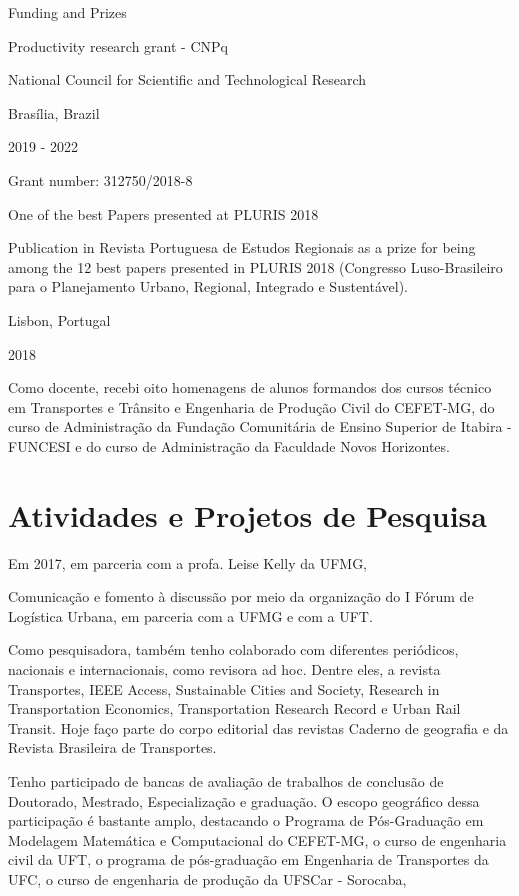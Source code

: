 \documentclass[
]{book}
\begin{document}
Funding and Prizes

Productivity research grant - CNPq

National Council for Scientific and Technological Research

Brasília, Brazil

2019 - 2022

Grant number: 312750/2018-8

One of the best Papers presented at PLURIS 2018

Publication in Revista Portuguesa de Estudos Regionais as a prize for
being among the 12 best papers presented in PLURIS 2018 (Congresso
Luso-Brasileiro para o Planejamento Urbano, Regional, Integrado e
Sustentável).

Lisbon, Portugal

2018

Como docente, recebi oito homenagens de alunos formandos dos cursos
técnico em Transportes e Trânsito e Engenharia de Produção Civil do
CEFET-MG, do curso de Administração da Fundação Comunitária de Ensino
Superior de Itabira - FUNCESI e do curso de Administração da Faculdade
Novos Horizontes.

\hypertarget{atividades-e-projetos-de-pesquisa}{%
\section{Atividades e Projetos de
Pesquisa}\label{atividades-e-projetos-de-pesquisa}}

Em 2017, em parceria com a profa. Leise Kelly da UFMG,

Comunicação e fomento à discussão por meio da organização do I Fórum de
Logística Urbana, em parceria com a UFMG e com a UFT.

Como pesquisadora, também tenho colaborado com diferentes periódicos,
nacionais e internacionais, como revisora ad hoc. Dentre eles, a revista
Transportes, IEEE Access, Sustainable Cities and Society, Research in
Transportation Economics, Transportation Research Record e Urban Rail
Transit. Hoje faço parte do corpo editorial das revistas Caderno de
geografia e da Revista Brasileira de Transportes.

Tenho participado de bancas de avaliação de trabalhos de conclusão de
Doutorado, Mestrado, Especialização e graduação. O escopo geográfico
dessa participação é bastante amplo, destacando o Programa de
Pós-Graduação em Modelagem Matemática e Computacional do CEFET-MG, o
curso de engenharia civil da UFT, o programa de pós-graduação em
Engenharia de Transportes da UFC, o curso de engenharia de produção da
UFSCar - Sorocaba,
\end{document}
